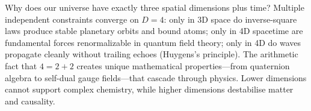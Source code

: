 Why does our universe have exactly three spatial dimensions plus time? Multiple independent constraints converge on $D=4$: only in 3D space do inverse-square laws produce stable planetary orbits and bound atoms; only in 4D spacetime are fundamental forces renormalizable in quantum field theory; only in 4D do waves propagate cleanly without trailing echoes (Huygens's principle). The arithmetic fact that $4 = 2+2$ creates unique mathematical properties—from quaternion algebra to self-dual gauge fields—that cascade through physics. Lower dimensions cannot support complex chemistry, while higher dimensions destabilise matter and causality.